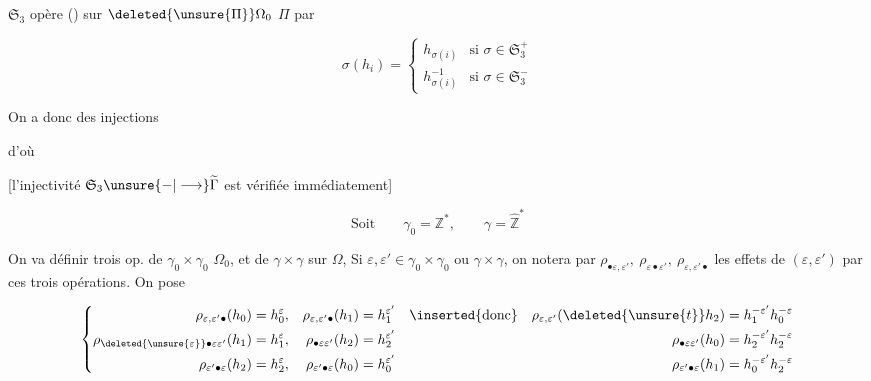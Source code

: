 $\mathfrak S_3$ opère () sur $\deleted{\unsure{\Pi}}\Omega_0$  $\Pi$ par

\[
 \sigma(h_i)=\begin{cases}
 h_{\sigma(i)}&\text{si }\sigma\in\mathfrak S_3^+\\
 h_{\sigma(i)}^{-1}&\text{si }\sigma\in\mathfrak S_3^-
 \end{cases}
\]

On a donc des injections


d'où


[l'injectivité $\mathfrak S_3\unsure{-|\longrightarrow}\widetilde\Gamma$ est vérifiée immédiatement]

\[
 \text{Soit}\qquad\gamma_0=\mathbb Z^*,\qquad
 \gamma=\widehat{\mathbb Z}^{*}
\]

On va définir trois op. de $\gamma_0\times\gamma_0$   $\Omega_0$, et de $\gamma\times\gamma$ sur $\Omega$,  Si $\varepsilon,\varepsilon'\in\gamma_0\times\gamma_0$ ou $\gamma\times\gamma$, on notera par $\rho_{\bullet\varepsilon,\varepsilon'},\ \rho_{\varepsilon\bullet\varepsilon'},\ \rho_{\varepsilon,\varepsilon'\bullet}$ les effets de $(\varepsilon,\varepsilon')$  par ces trois opérations. On pose

\[
\left\{\begin{aligned}
 \rho_{\varepsilon,\varepsilon'\bullet}(h_0)&=h_0^\varepsilon,&
 \rho_{\varepsilon,\varepsilon'\bullet}(h_1)&=h_1^{\varepsilon'}&
 \inserted{\text{donc}}\quad\rho_{\varepsilon,\varepsilon'}(\deleted{\unsure{t}}h_2)&=h_1^{-\varepsilon'}h_0^{-\varepsilon}\\
 \rho_{\deleted{\unsure{\varepsilon}}\bullet\varepsilon\varepsilon'}(h_1)&=h_1^\varepsilon,&
 \rho_{\bullet\varepsilon\varepsilon'}(h_2)&=h_2^{\varepsilon'}&
 \rho_{\bullet\varepsilon\varepsilon'}(h_0)&=h_2^{-\varepsilon'}h_2^{-\varepsilon}\\
 \rho_{\varepsilon'\bullet\varepsilon}(h_2)&=h_2^\varepsilon,&
 \rho_{\varepsilon'\bullet\varepsilon}(h_0)&=h_0^{\varepsilon'}&
 \rho_{\varepsilon'\bullet\varepsilon}(h_1)&=h_0^{-\varepsilon'}h_2^{-\varepsilon}
\end{aligned}\right.
\]

